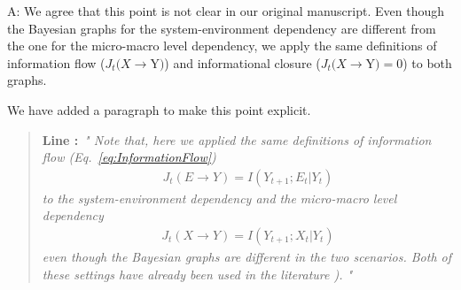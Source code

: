 \documentclass[utf8]{article}
\newenvironment{ans}  
    {\color{Black}\noindent A:}
    {~\newline}
\newcommand{\addnew}[2]{\blockcquote{}{\textbf{Line #1:}~\newline\textit{"#2"}}
}
\begin{document}
    	\begin{ans}
    		We agree that this point is not clear in our original manuscript. Even though the Bayesian graphs for the system-environment dependency are different from the one for the micro-macro level dependency, we apply the same definitions of information flow ($J_{t}(X \rightarrow $Y$ )$) and informational closure ($J_{t}(X \rightarrow $Y$ )=0$) to both graphs. 
    		
    		
    		
    		We have added a paragraph to make this point explicit. 
    		
    		\addnew{}{
    			Note that, here we applied the same definitions of information flow (Eq.~\ref{eq:InformationFlow}) 
    			\begin{align}
    			    J_{t}(E \rightarrow Y )=I(Y_{t+1};E_t|Y_t)
    			\end{align}
    			to the system-environment dependency
                 and the micro-macro level dependency
                 \begin{align}
    			    J_{t}(X \rightarrow Y )=I(Y_{t+1};X_t|Y_t)
    			\end{align}  
                 even though the Bayesian graphs are different in the two scenarios. Both of these settings have already been used in the literature \citep[see][]{BERTSCHINGER.2006, PFANTE.2014}).
    		}	
    		
    		
    		

\end{ans}
\end{document}
